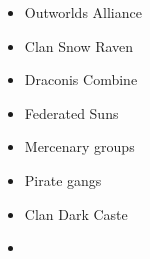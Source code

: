\begin{multicols}{2}

\begin{itemize}

\item Outworlds Alliance

\item Clan Snow Raven

\item Draconis Combine

\item Federated Suns

\item Mercenary groups

\item Pirate gangs

\item Clan Dark Caste

\item[\vspace{\fill}]

\end{itemize}

\end{multicols}
